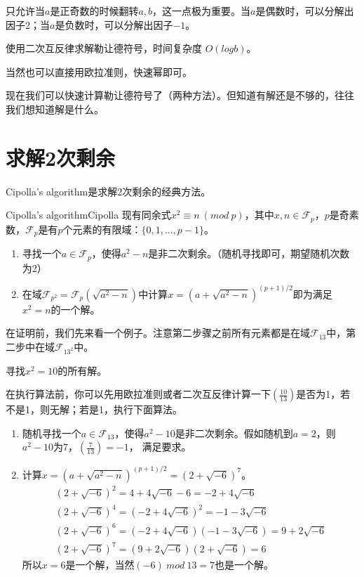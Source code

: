 \begin{note}
只允许当$a$是正奇数的时候翻转$a,b$，这一点极为重要。当$a$是偶数时，可以分解出因子2；当$a$是负数时，可以分解出因子$-1$。
\end{note}

\vbox{}

使用二次互反律求解勒让德符号，时间复杂度  $O(logb)$。

{\heiti 当然也可以直接用欧拉准则，快速幂即可。}



现在我们可以快速计算勒让德符号了（两种方法）。{\heiti 但知道有解还是不够的，往往我们想知道解是什么。}


\section{求解2次剩余}
Cipolla's algorithm是求解2次剩余的经典方法。
\begin{theorem}{Cipolla's algorithm}{Cipolla}
现有同余式$x^2\equiv n\ (mod\ p)$，其中$x,n\in \mathcal{F}_p$，$p$是奇素数，$\mathcal{F}_p$是有$p$个元素的有限域：$\{0,1,...,p-1\}$。
\begin{enumerate}
\item 寻找一个$a\in \mathcal{F}_p$，使得$a^2-n$是非二次剩余。（随机寻找即可，期望随机次数为2）
\item 在域$\mathcal{F}_{p^2}=\mathcal{F}_p(\sqrt{a^2-n})$中计算$x = (a+\sqrt{a^2-n})^{(p+1)/2}$即为满足$x^2=n$的一个解。
\end{enumerate}
\end{theorem}

在证明前，我们先来看一个例子。注意第二步骤之前所有元素都是在域$\mathcal{F}_{13}$中，第二步中在域$\mathcal{F}_{13^2}$中。

寻找$x^2=10$的所有解。

在执行算法前，你可以先用欧拉准则或者二次互反律计算一下$\left(  \frac{10}{13}  \right)$是否为1，若不是1，则无解；若是1，执行下面算法。

\begin{enumerate}
\item 随机寻找一个$a\in \mathcal{F}_{13}$，使得$a^2-10$是非二次剩余。假如随机到$a=2$，则$a^2-10$为$7$，$\left(  \frac{7}{13}  \right)=-1$，
满足要求。
\item 计算$x = (a+\sqrt{a^2-n})^{(p+1)/2} = (2+\sqrt{-6})^7$。
$$
\begin{array}{l}{(2+\sqrt{-6})^{2}=4+4 \sqrt{-6}-6=-2+4 \sqrt{-6}} \\ {(2+\sqrt{-6})^{4}=(-2+4 \sqrt{-6})^{2}=-1-3 \sqrt{-6}} \\ {(2+\sqrt{-6})^{6}=(-2+4 \sqrt{-6})(-1-3 \sqrt{-6})=9+2 \sqrt{-6}} \\ {(2+\sqrt{-6})^{7}=(9+2 \sqrt{-6})(2+\sqrt{-6})=6}\end{array}
$$
所以$x=6$是一个解，当然$(-6)\ mod\ 13 = 7$也是一个解。
\end{enumerate}

